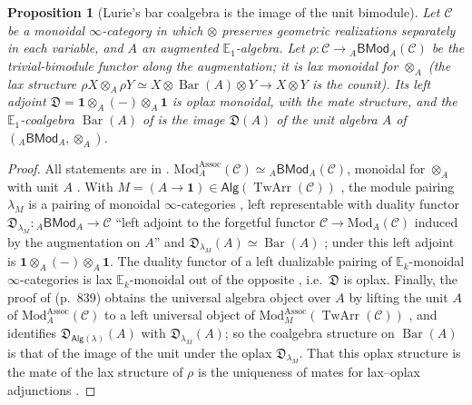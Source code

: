 \documentclass[11pt]{amsart}
\newtheorem{proposition}[subsection]{Proposition}
\theoremstyle{definition}
\theoremstyle{remark}
\newcommand{\Alg}{\mathsf{Alg}}
\newcommand{\BMod}{\mathsf{BMod}}
\newcommand{\unit}{\mathbf{1}}
\newcommand{\BarC}{\operatorname{Bar}}
\newcommand{\TwArr}{\operatorname{TwArr}}
\newcommand{\Fpt}{\mathfrak{D}}
\begin{document}
\begin{proposition}[Lurie's bar coalgebra is the image of the unit bimodule]\label{prop:a}
Let $\mathcal C$ be a monoidal $\infty$-category in which $\otimes$ preserves geometric realizations separately in each variable, and $A$ an augmented $\mathbb{E}_1$-algebra. Let $\rho\colon\mathcal C\to{}_A\BMod_A(\mathcal C)$ be the trivial-bimodule functor along the augmentation; it is lax monoidal for $\otimes_A$ (the lax structure $\rho X\otimes_A\rho Y\simeq X\otimes\BarC(A)\otimes Y\to X\otimes Y$ is the counit). Its left adjoint $\Fpt=\unit\otimes_A(-)\otimes_A\unit$ is oplax monoidal, with the mate structure, and the $\mathbb{E}_1$-coalgebra $\BarC(A)$ of \cite[Theorem 5.2.2.17(2)]{HA} is the image $\Fpt(A)$ of the unit algebra $A$ of $({}_A\BMod_A,\otimes_A)$.
\end{proposition}
\begin{proof}
All statements are in \cite[\S 5.2.2]{HA}. $\mathrm{Mod}^{\mathrm{Assoc}}_A(\mathcal C)\simeq{}_A\BMod_A(\mathcal C)$, monoidal for $\otimes_A$ with unit $A$ \cite[4.4.1.28]{HA}. With $M=(A\to\unit)\in\Alg(\TwArr(\mathcal C))$ \cite[Example 5.2.2.35]{HA}, the module pairing $\lambda_M$ is a pairing of monoidal $\infty$-categories \cite[Lemma 5.2.2.29]{HA}, left representable with duality functor $\Fpt_{\lambda_M}\colon{}_A\BMod_A\to\mathcal C$ ``left adjoint to the forgetful functor $\mathcal C\to\mathrm{Mod}_A(\mathcal C)$ induced by the augmentation on $A$'' and $\Fpt_{\lambda_M}(A)\simeq\BarC(A)$ \cite[Corollary 5.2.2.41]{HA}; under \cite[Example 5.2.2.3]{HA} this left adjoint is $\unit\otimes_A(-)\otimes_A\unit$. The duality functor of a left dualizable pairing of $\mathbb{E}_k$-monoidal $\infty$-categories is lax $\mathbb{E}_k$-monoidal out of the opposite \cite[Remark 5.2.2.25]{HA}, i.e.\ $\Fpt$ is oplax. Finally, the proof of \cite[Theorem 5.2.2.17]{HA} (p.~839) obtains the universal algebra object over $A$ by lifting the unit $A$ of $\mathrm{Mod}^{\mathrm{Assoc}}_A(\mathcal C)$ to a left universal object of $\mathrm{Mod}^{\mathrm{Assoc}}_M(\TwArr(\mathcal C))$ \cite[Propositions 5.2.2.27, 5.2.2.28]{HA}, and identifies $\Fpt_{\Alg(\lambda)}(A)$ with $\Fpt_{\lambda_M}(A)$; so the coalgebra structure on $\BarC(A)$ is that of the image of the unit under the oplax $\Fpt_{\lambda_M}$. That this oplax structure is the mate of the lax structure of $\rho$ is the uniqueness of mates for lax--oplax adjunctions \cite{HHLN}.
\end{proof}
\end{document}
